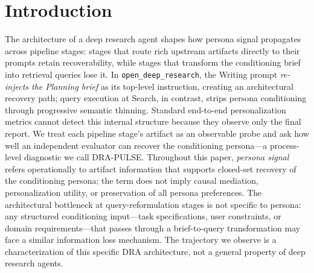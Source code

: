 \documentclass[]{article}
\begin{document}
\section{Introduction}
\label{sec:intro}
The architecture of a deep research agent shapes how persona signal propagates across pipeline stages: stages that route rich upstream artifacts directly to their prompts retain recoverability, while stages that transform the conditioning brief into retrieval queries lose it.
In \texttt{open\_deep\_research}, the Writing prompt \emph{re-injects the Planning brief} as its top-level instruction, creating an architectural recovery path; query execution at Search, in contrast, strips persona conditioning through progressive semantic thinning.
Standard end-to-end personalization metrics cannot detect this internal structure because they observe only the final report.
We treat each pipeline stage's artifact as an observable probe and ask how well an independent evaluator can recover the conditioning persona---a process-level diagnostic we call DRA-PULSE.
Throughout this paper, \emph{persona signal} refers operationally to artifact information that supports closed-set recovery of the conditioning persona; the term does not imply causal mediation, personalization utility, or preservation of all persona preferences.
The architectural bottleneck at query-reformulation stages is not specific to persona: any structured conditioning input---task specifications, user constraints, or domain requirements---that passes through a brief-to-query transformation may face a similar information loss mechanism.
The trajectory we observe is a characterization of this specific DRA architecture, not a general property of deep research agents.
\end{document}
